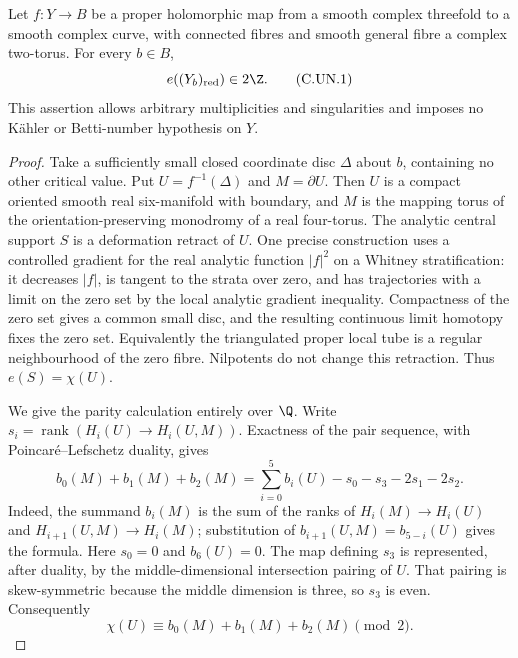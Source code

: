 
\begin{proposition}\label{cdp:st:C.2.UN.1}
Let $f:Y\to B$ be a proper holomorphic map from a smooth complex
threefold to a smooth complex curve, with connected fibres and smooth
general fibre a complex two-torus. For every $b\in B$,
\[
                    e((Y_b)_{\rm red})\in2\Z.       \tag{C.UN.1}\label{cdp:eq:C.UN.1}
\]
This assertion allows arbitrary multiplicities and singularities and
imposes no K\"ahler or Betti-number hypothesis on $Y$.
\end{proposition}
\begin{proof}
Take a sufficiently small closed coordinate disc $\Delta$ about $b$,
containing no other critical value. Put $U=f^{-1}(\Delta)$ and
$M=\partial U$. Then $U$ is a compact oriented smooth real six-manifold
with boundary, and $M$ is the mapping torus of the orientation-preserving
monodromy of a real four-torus. The analytic central support $S$ is a
deformation retract of $U$. One precise construction uses a controlled
gradient for the real analytic function $|f|^2$ on a Whitney
stratification: it decreases $|f|$, is tangent to the strata over zero,
and has trajectories with a limit on the zero set by the local
analytic gradient inequality. Compactness of the zero set gives a
common small disc, and the resulting continuous limit homotopy fixes
the zero set. Equivalently the triangulated proper local tube is a
regular neighbourhood of the zero fibre. Nilpotents do not change this
retraction. Thus $e(S)=\chi(U)$.

We give the parity calculation entirely over $\Q$. Write
$s_i=\operatorname{rank}(H_i(U)\to H_i(U,M))$.
Exactness of the pair sequence, with Poincar\'e--Lefschetz duality,
gives
\[
 b_0(M)+b_1(M)+b_2(M)
       =\sum_{i=0}^{5}b_i(U)-s_0-s_3-2s_1-2s_2.
                                                        \tag{C.UN.2}\label{cdp:eq:C.UN.2}
\]
Indeed, the summand $b_i(M)$ is the sum of the ranks of
$H_i(M)\to H_i(U)$ and $H_{i+1}(U,M)\to H_i(M)$;
substitution of $b_{i+1}(U,M)=b_{5-i}(U)$ gives the formula.
Here $s_0=0$ and $b_6(U)=0$. The map defining $s_3$ is represented,
after duality, by the middle-dimensional intersection pairing of $U$.
That pairing is skew-symmetric because the middle dimension is three,
so $s_3$ is even. Consequently
\[
 \chi(U)\equiv b_0(M)+b_1(M)+b_2(M)\pmod2.            \tag{C.UN.3}\label{cdp:eq:C.UN.3}
\]


\end{proof}
